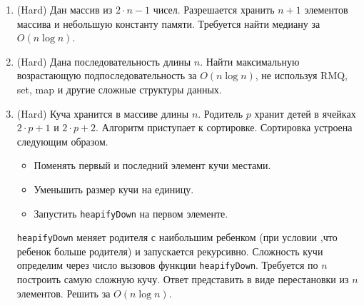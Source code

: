 \begin{enumerate}
  \item (Hard)  Дан массив из $2 \cdot n - 1$ чисел. Разрешается хранить 
	$n + 1$ элементов массива и небольшую константу памяти. Требуется найти 
	медиану за $O(n \log n)$.

  \item (Hard) Дана последовательность длины $n$. Найти максимальную возрастающую 
	подпоследовательность за $O(n \log n)$, не используя RMQ, set, map и 
	другие сложные структуры данных.

  \item (Hard) Куча хранится в массиве длины $n$. Родитель $p$ хранит детей
	в ячейках $2 \cdot p + 1$ и $2 \cdot p + 2$. Алгоритм приступает
	к сортировке. Сортировка устроена следующим образом. 
	\begin{itemize}
	  \item Поменять первый и последний элемент кучи местами.
	  \item Уменьшить размер кучи на единицу.
	  \item Запустить \texttt{heapifyDown} на первом элементе.
	\end{itemize}
	\texttt{heapifyDown} меняет родителя с наибольшим ребенком (при условии
    ,что ребенок больше родителя) и запускается рекурсивно.
	Сложность кучи определим через число вызовов функции \texttt{heapifyDown}.
	Требуется по $n$ построить самую сложную кучу. Ответ представить в виде
	перестановки из $n$ элементов. Решить за $O(n \log n)$.

\end{enumerate}
